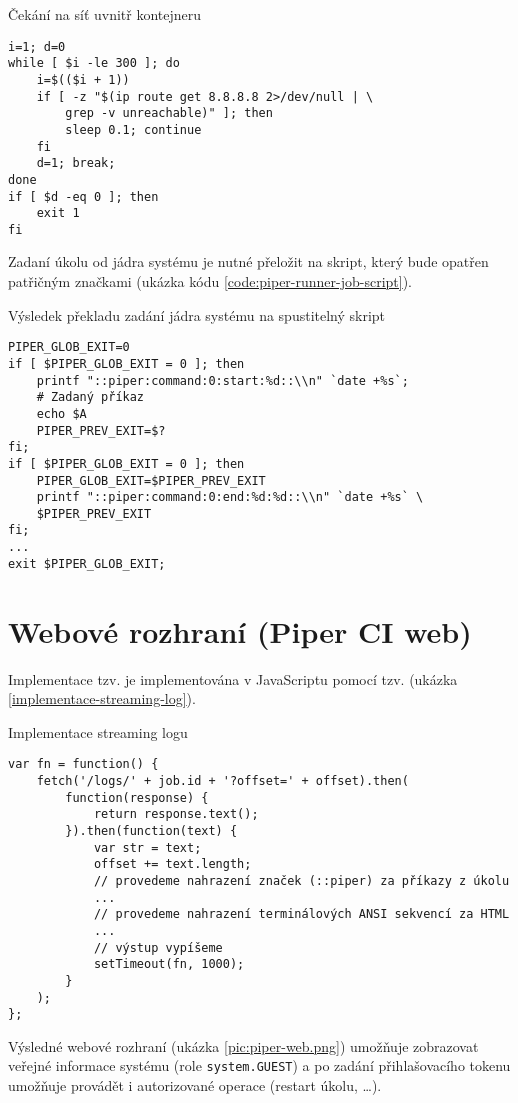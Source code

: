 \begin{listing}[ht]
\caption{\label{code:piper-runner-job-wait}Čekání na síť uvnitř kontejneru}
\begin{verbatim}
i=1; d=0
while [ $i -le 300 ]; do
    i=$(($i + 1))
    if [ -z "$(ip route get 8.8.8.8 2>/dev/null | \
        grep -v unreachable)" ]; then
        sleep 0.1; continue
    fi
    d=1; break;
done
if [ $d -eq 0 ]; then
    exit 1
fi
\end{verbatim}
\end{listing}

Zadaní úkolu od jádra systému je nutné přeložit na skript, který bude opatřen patřičným značkami (ukázka kódu \ref{code:piper-runner-job-script}).

\begin{listing}[ht]
\caption{\label{code:piper-runner-job-script}Výsledek překladu zadání jádra systému na spustitelný skript}
\begin{verbatim}
PIPER_GLOB_EXIT=0
if [ $PIPER_GLOB_EXIT = 0 ]; then
    printf "::piper:command:0:start:%d::\\n" `date +%s`;
    # Zadaný příkaz
    echo $A
    PIPER_PREV_EXIT=$?
fi;
if [ $PIPER_GLOB_EXIT = 0 ]; then
    PIPER_GLOB_EXIT=$PIPER_PREV_EXIT
    printf "::piper:command:0:end:%d:%d::\\n" `date +%s` \
    $PIPER_PREV_EXIT
fi;
...
exit $PIPER_GLOB_EXIT;
\end{verbatim}
\end{listing}

\section{Webové rozhraní (Piper CI web)}

Implementace tzv.  je implementována v JavaScriptu pomocí tzv.  (ukázka \ref{implementace-streaming-log}).

\begin{listing}[ht]
\caption{\label{implementace-streaming-log}Implementace streaming logu}
\begin{verbatim}
var fn = function() {
    fetch('/logs/' + job.id + '?offset=' + offset).then(
        function(response) {
            return response.text();
        }).then(function(text) {
            var str = text;
            offset += text.length;
            // provedeme nahrazení značek (::piper) za příkazy z úkolu
            ...
            // provedeme nahrazení terminálových ANSI sekvencí za HTML
            ...
            // výstup vypíšeme
            setTimeout(fn, 1000);
        }
    );
};
\end{verbatim}
\end{listing}

Výsledné webové rozhraní (ukázka \ref{pic:piper-web.png}) umožňuje zobrazovat veřejné informace systému (role \verb|system.GUEST|) a po zadání přihlašovacího tokenu umožňuje provádět i autorizované operace (restart úkolu, \ldots).


